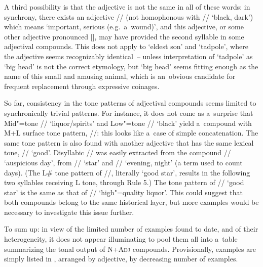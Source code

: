 A third possibility is that the adjective is not the same in all of these words: in synchrony, there
exists an adjective // (not homophonous with // ‘black, dark’) which means ‘important, serious (e.g.~a~wound)’, and this
adjective, or some other adjective pronounced [], may have provided the second syllable in
some adjectival compounds. This does not apply to ‘eldest son’ and ‘tadpole’, where the adjective
seems recognizably identical~-- unless interpretation of ‘tadpole’ as ‘big head’ is not the correct etymology,
but ‘big head’ seems fitting enough as the name of this small and amusing animal, which is an~obvious
candidate for frequent replacement through expressive coinages.

So far, consistency in the tone patterns of adjectival compounds seems limited to synchronically trivial
patterns. For instance, it does not come as a~surprise that Mid"=tone // ‘liquor/spirits’ and Low"=tone
// ‘black’ yield a~compound with M+L surface tone pattern, //: this looks
like a~case of simple concatenation. The same tone pattern is also found with another adjective that has
the same lexical tone, // ‘good’. Disyllabic // was easily extracted from the compound // ‘auspicious
day’, from // ‘star’ and // ‘evening, night’ (a
term used to count days). (The L\# tone pattern of //, literally ‘good star’, results in the following two syllables receiving L tone,
through Rule 5.) 
The tone pattern of // ‘good star’ is the same as that of // ‘high"=quality liquor’. This could suggest that both compounds belong to the same historical layer, but more examples would be necessary to investigate this issue further.

To sum up: in view of the limited number of examples found to date, and of their heterogeneity, it does not
appear illuminating to pool them all into a~table summarizing the tonal output of
\textsc{N}+\textsc{Adj} compounds. Provisionally, examples are simply listed in , arranged by adjective, by decreasing number of examples.


